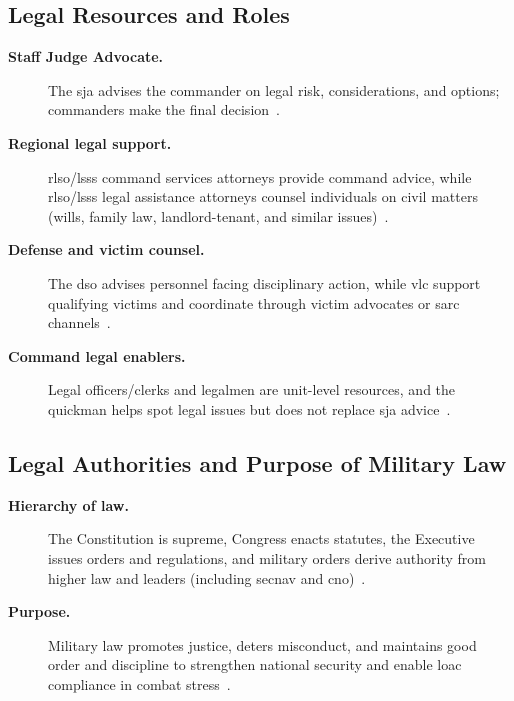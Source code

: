 \documentclass[../main.tex]{subfiles}
\begin{document}
\subsection{Legal Resources and Roles}
\begin{description}
  \item[\textbf{Staff Judge Advocate.}] The \ac{sja} advises the commander on legal risk, considerations, and options; commanders make the final decision~\autocite{edo-5-1-1-naval-justice-standards-2025}.
  \item[\textbf{Regional legal support.}] \ac{rlso}/\ac{lsss} command services attorneys provide command advice, while \ac{rlso}/\ac{lsss} legal assistance attorneys counsel individuals on civil matters (wills, family law, landlord-tenant, and similar issues)~\autocite{edo-5-1-1-naval-justice-standards-2025}.
  \item[\textbf{Defense and victim counsel.}] The \ac{dso} advises personnel facing disciplinary action, while \ac{vlc} support qualifying victims and coordinate through victim advocates or \ac{sarc} channels~\autocite{edo-5-1-1-naval-justice-standards-2025}.
  \item[\textbf{Command legal enablers.}] Legal officers/clerks and legalmen are unit-level resources, and the \ac{quickman} helps spot legal issues but does not replace \ac{sja} advice~\autocite{edo-5-1-1-naval-justice-standards-2025}.
\end{description}

\subsection{Legal Authorities and Purpose of Military Law}
\begin{description}
  \item[\textbf{Hierarchy of law.}] The Constitution is supreme, Congress enacts statutes, the Executive issues orders and regulations, and military orders derive authority from higher law and leaders (including \ac{secnav} and \ac{cno})~\autocite{edo-5-1-1-naval-justice-standards-2025}.
  \item[\textbf{Purpose.}] Military law promotes justice, deters misconduct, and maintains good order and discipline to strengthen national security and enable \ac{loac} compliance in combat stress~\autocite{edo-5-1-1-naval-justice-standards-2025}.
\end{description}
\end{document}
